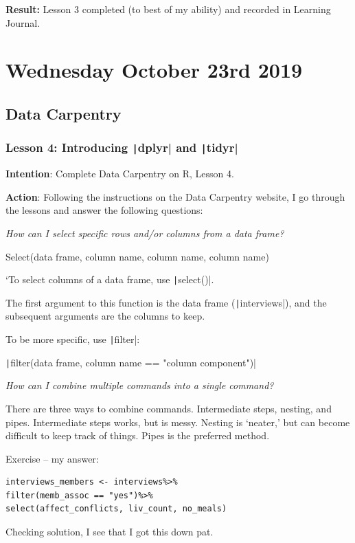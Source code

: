\documentclass{article}
\begin{document}
\textbf{Result:} Lesson 3 completed (to best of my ability) and recorded in Learning Journal.

\section{Wednesday October 23rd 2019}

\subsection{Data Carpentry}

\subsubsection{Lesson 4: Introducing \texttt|dplyr| and \texttt|tidyr|}

\textbf{Intention}: Complete Data Carpentry on R, Lesson 4.

\textbf{Action}: Following the instructions on the Data Carpentry website, I go through the lessons and answer the following questions:

\textit{How can I select specific rows and/or columns from a data frame?}

Select(data frame, column name, column name, column name)

`To select columns of a data frame, use \texttt|select()|.

The first argument to this function is the data frame (\texttt|interviews|), and the subsequent arguments are the columns to keep.

To be more specific, use \texttt|filter|:

\texttt|filter(data frame, column name == "column component")|

\textit{How can I combine multiple commands into a single command?}

There are three ways to combine commands.
Intermediate steps, nesting, and pipes.
Intermediate steps works, but is messy.
Nesting is ‘neater,’ but can become difficult to keep track of things.
Pipes is the preferred method.

Exercise – my answer: 

\begin{verbatim}
interviews_members <- interviews%>%
filter(memb_assoc == "yes")%>%
select(affect_conflicts, liv_count, no_meals)
\end{verbatim}

Checking solution, I see that I got this down pat.
\end{document}
